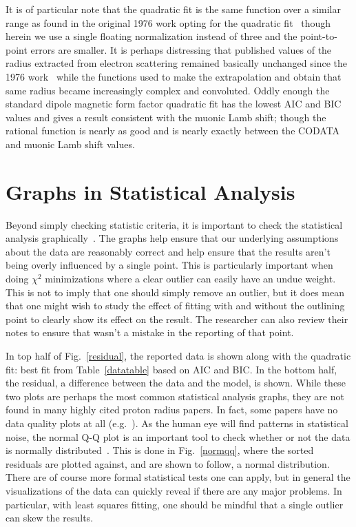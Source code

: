 \documentclass[10pt,aps,prc,twocolumn]{revtex4-1}
\begin{document}
It is of particular note that the quadratic fit is the same function over a similar range as found in the original 1976 work opting for
the quadratic fit~\cite{Borkowski:1975ume} though herein we 
use a single floating normalization instead of three and the point-to-point errors are smaller.   
It is perhaps distressing that published values of the 
radius extracted from electron scattering remained basically unchanged since the 1976 work~\cite{Borkowski:1975ume} while the 
functions used to make the extrapolation and obtain that same radius became increasingly complex and convoluted.
Oddly enough the standard dipole magnetic form factor quadratic fit has the lowest AIC and BIC values and gives a result consistent
with the muonic Lamb shift; though the rational function is nearly as good and is nearly exactly between the CODATA
and muonic Lamb shift values.    


\section{Graphs in Statistical Analysis}

Beyond simply checking statistic criteria, it is important to check the statistical analysis graphically~\cite{Anscombe:1973}.
The graphs help ensure that our underlying assumptions about the data are reasonably correct and help ensure that the results
aren't being overly influenced by a single point.   This is particularly important when doing $\chi^2$ minimizations where a
clear outlier can easily have an undue weight.    This is not to imply that one should simply remove an outlier, but it does
mean that one might wish to study the effect of fitting with and without the outlining point to clearly show its effect on 
the result.   The researcher can also review their notes to ensure that wasn't a mistake in the reporting of that point.

In top half of Fig.~\ref{residual}, the reported data is shown along with the quadratic fit:  best fit from Table~\ref{datatable} based
on AIC and BIC.   In the bottom half, the residual, a difference between the data and the model, is shown.     While these two plots
are perhaps the most common statistical analysis graphs, they are not found in many highly cited proton radius papers.  In fact, some
papers have no data quality plots at all (e.g.~\cite{Rosenfelder:1999cd}).
As the human eye will find patterns in statistical noise, the normal Q-Q plot is an important tool to check whether or not the 
data is normally distributed~\cite{Wilk:1968}.   This is done in Fig.~\ref{normqq}, where the sorted residuals are plotted against,
and are shown to follow, a normal distribution.   There are of course more formal statistical tests one can apply, but in general the
visualizations of the data can quickly reveal if there are any major problems.   In particular, with least squares fitting, one should
be mindful that a single outlier can skew the results.
\end{document}
